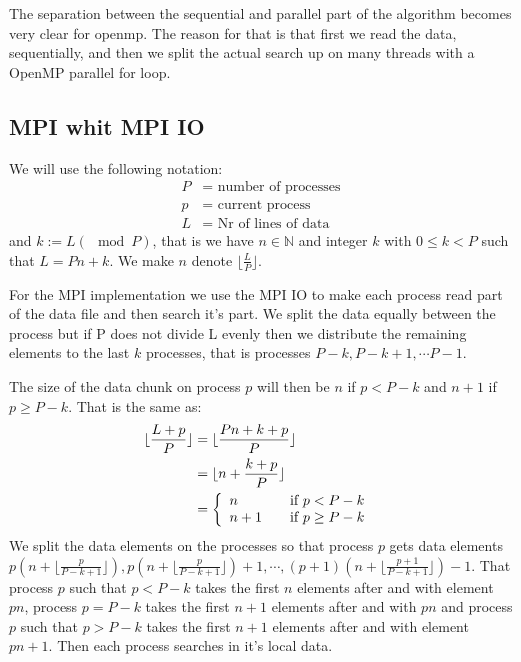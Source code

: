 \documentclass[a4paper,10pt]{article}
\begin{document}
  
  The separation between the sequential and parallel part of the algorithm becomes very clear 
  for openmp. The reason for that is that first we read the data, sequentially, and then we
  split the actual search up on many threads with a OpenMP parallel for loop.  
  

\subsection{MPI whit MPI IO}
\label{sec:MPIO}

  We will use the following notation:
  \begin{align*}
    P &= \text{ number of processes} \\
    p &= \text{ current process}  \\
    L &= \text{ Nr of lines of data } 
  \end{align*}
  and $k:= L (\mod P)$, that is we have $n\in \mathbb{N}$ and integer $k$ with $0\leq k < P$
  such that $L = Pn+k$.  We make $n$ denote $\lfloor \frac{L}{P} \rfloor$.

  For the MPI implementation we use the MPI IO to make each process read part of the data file
  and then search it's part.  We split the data equally between the process but if
  P does not divide L evenly then we distribute the remaining elements to the last $k$ processes,
  that is processes $P-k,P-k+1,\cdots P-1$.
  
  The size of the data chunk on process $p$ will then be $n$ if $p<P-k$ and $n+1$ if $p\geq P-k$.
  That is the same as:
  \begin{align*}
    \lfloor \frac{L+p}{P}\rfloor  &= \lfloor \frac{Pn+k+p}{P}\rfloor  \\
                                  &= \lfloor n+\frac{k+p}{P}\rfloor   \\
                                  &=                                  
                                  \left\{
                                    \begin{array}{l l}
                                       n   & \quad \text{if $p<P-k$ }\\
                                       n+1 & \quad \text{if $p\geq P-k$}\\
                                     \end{array} \right.
  \end{align*}
  We split the data elements on the processes so that process $p$ 
  gets data elements 
  $p\left( n + \lfloor \frac{p}{P-k+1} \rfloor \right),
   p\left( n + \lfloor \frac{p}{P-k+1} \rfloor \right)+1, \cdots,
   (p+1)\left( n + \lfloor \frac{p+1}{P-k+1} \rfloor \right)-1
  $.
  That process $p$ such that $p<P-k$ takes the first $n$ elements
  after and with element $ p n $, process $p=P-k$ takes the first
  $n+1$ elements after and with $ p n $
  and process $p$ such that $p>P-k$ takes the first $n+1$ elements after and
  with element $ p n +1 $.
  Then each process searches in it's local data.
\end{document}
